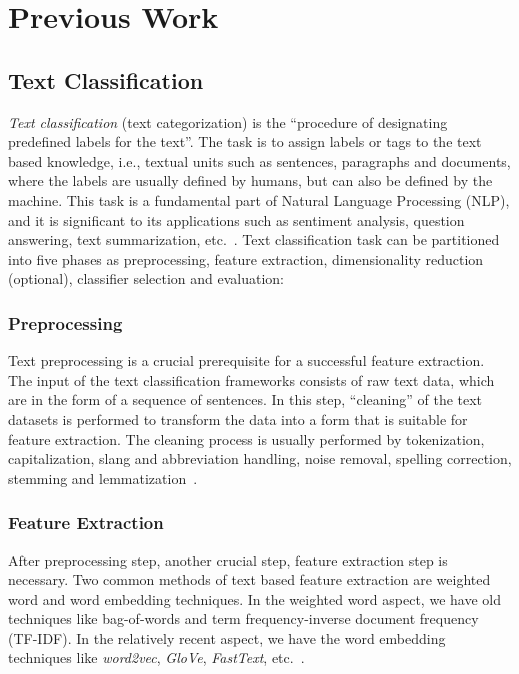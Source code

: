 \section{Previous Work}
\subsection{Text Classification}\label{sec:TC}
\emph{Text classification} (text categorization) is the ``procedure of designating predefined labels for the text''. The task is to assign labels or tags to the text based knowledge, i.e., textual units such as sentences, paragraphs and documents, where the labels are usually defined by humans, but can also be defined by the machine. This task is a fundamental part of Natural Language Processing (NLP), and it is significant to its applications such as sentiment analysis, question answering, text summarization, etc.~\autocite{li20tc}. Text classification task can be partitioned into five phases as preprocessing, feature extraction, dimensionality reduction (optional), classifier selection and evaluation:

\subsubsection{Preprocessing}
Text preprocessing is a crucial prerequisite for a successful feature extraction. The input of the text classification frameworks consists of raw text data, which are in the form of a sequence of sentences. In this step, ``cleaning'' of the text datasets is performed to transform the data into a form that is suitable for feature extraction. The cleaning process is usually performed by tokenization, capitalization, slang and abbreviation handling, noise removal, spelling correction, stemming and lemmatization~\autocite{kowsari19tc}.

\subsubsection{Feature Extraction}
After preprocessing step, another crucial step, feature extraction step is necessary. Two common methods of text based feature extraction are weighted word and word embedding techniques. In the weighted word aspect, we have old techniques like bag-of-words and term frequency-inverse document frequency (TF-IDF). In the relatively recent aspect, we have the word embedding techniques like \emph{word2vec}, \emph{GloVe}, \emph{FastText}, etc.~\autocite{kowsari19tc}.

